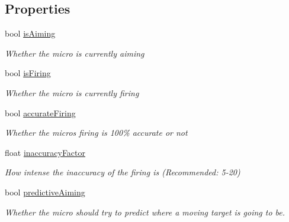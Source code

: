 \subsection*{Properties}
\begin{DoxyCompactItemize}
\item 
bool \mbox{\hyperlink{class_lua_1_1_shooting_a0c512eac7dea63f8594bbfcb0976a34a}{is\+Aiming}}
\begin{DoxyCompactList}\small\item\em Whether the micro is currently aiming \end{DoxyCompactList}\item 
bool \mbox{\hyperlink{class_lua_1_1_shooting_a0b4d9622c4a1888f424ebdc13db498d1}{is\+Firing}}
\begin{DoxyCompactList}\small\item\em Whether the micro is currently firing \end{DoxyCompactList}\item 
bool \mbox{\hyperlink{class_lua_1_1_shooting_af30c3a5b6caca44684fcd88ac7f7f4a7}{accurate\+Firing}}
\begin{DoxyCompactList}\small\item\em Whether the micro\textquotesingle{}s firing is 100\% accurate or not \end{DoxyCompactList}\item 
float \mbox{\hyperlink{class_lua_1_1_shooting_a7f8c04173b4649a5b6134344e67dc10a}{inaccuracy\+Factor}}
\begin{DoxyCompactList}\small\item\em How intense the inaccuracy of the firing is (Recommended\+: 5-\/20) \end{DoxyCompactList}\item 
bool \mbox{\hyperlink{class_lua_1_1_shooting_adc410fd560cfdc7bdbd5b870a7adedbf}{predictive\+Aiming}}
\begin{DoxyCompactList}\small\item\em Whether the micro should try to predict where a moving target is going to be. \end{DoxyCompactList}\item 

\end{DoxyCompactItemize}
